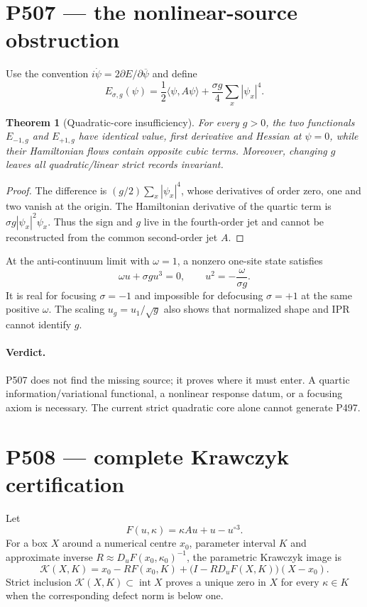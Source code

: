 \documentclass[11pt,a4paper]{article}
\newtheorem{theorem}{Theorem}[section]
\theoremstyle{definition}
\theoremstyle{remark}
\begin{document}
\section{P507 --- the nonlinear-source obstruction}

Use the convention $i\dot\psi=2\partial E/\partial\overline\psi$ and define
\[
 E_{\sigma,g}(\psi)=\frac12\langle\psi,A\psi\rangle
 +\frac{\sigma g}{4}\sum_x|\psi_x|^4.
\]

\begin{theorem}[Quadratic-core insufficiency]
For every $g>0$, the two functionals $E_{-1,g}$ and $E_{+1,g}$ have identical value, first derivative and Hessian at $\psi=0$, while their Hamiltonian flows contain opposite cubic terms. Moreover, changing $g$ leaves all quadratic/linear strict records invariant.
\end{theorem}
\begin{proof}
The difference is $(g/2)\sum_x|\psi_x|^4$, whose derivatives of order zero, one and two vanish at the origin. The Hamiltonian derivative of the quartic term is $\sigma g|\psi_x|^2\psi_x$. Thus the sign and $g$ live in the fourth-order jet and cannot be reconstructed from the common second-order jet $A$.
\end{proof}

At the anti-continuum limit with $\omega=1$, a nonzero one-site state satisfies
\[
 \omega u+\sigma g u^3=0,\qquad u^2=-\frac{\omega}{\sigma g}.
\]
It is real for focusing $\sigma=-1$ and impossible for defocusing $\sigma=+1$ at the same positive $\omega$. The scaling $u_g=u_1/\sqrt g$ also shows that normalized shape and IPR cannot identify $g$.

\paragraph{Verdict.} P507 does not find the missing source; it proves where it must enter. A quartic information/variational functional, a nonlinear response datum, or a focusing axiom is necessary. The current strict quadratic core alone cannot generate P497.

\section{P508 --- complete Krawczyk certification}

Let
\[
 F(u,\kappa)=\kappa Au+u-u^{\circ3}.
\]
For a box $X$ around a numerical centre $x_0$, parameter interval $K$ and approximate inverse $R\approx D_uF(x_0,\kappa_0)^{-1}$, the parametric Krawczyk image is
\[
 \mathcal K(X,K)=x_0-RF(x_0,K)
 +\bigl(I-RD_uF(X,K)\bigr)(X-x_0).
\]
Strict inclusion $\mathcal K(X,K)\subset\operatorname{int}X$ proves a unique zero in $X$ for every $\kappa\in K$ when the corresponding defect norm is below one.
\end{document}
